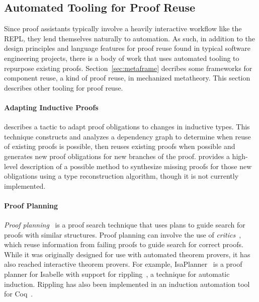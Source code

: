 

\subsection{Automated Tooling for Proof Reuse}
\label{sec:toolingreuse}

Since proof assistants typically involve a heavily interactive workflow like the REPL, they lend themselves naturally to automation.
As such, in addition to the design principles and language features for proof reuse found in typical
software engineering projects, there is a body of work that uses automated tooling
to repurpose existing proofs. Section~\ref{sec:metaframe} decribes some frameworks
for component reuse, a kind of proof reuse, in mechanized metatheory. This section describes
other tooling for proof reuse.

\paragraph{Adapting Inductive Proofs} \cite{Boite2004} describes a tactic to adapt proof obligations
to changes in inductive types. This technique constructs and analyzes a dependency graph to determine
when reuse of existing proofs is possible, then reuses existing proofs when possible
and generates new proof obligations for new branches of the proof. \cite{Mulhern06proofweaving} provides a high-level
description of a possible method to synthesize missing proofs for those new obligations using a type reconstruction algorithm,
though it is not currently implemented.

\paragraph{Proof Planning} \textit{Proof planning}~\citep{Bundy1998} is a proof search technique
that uses plans to guide search for proofs with similar structures.
Proof planning can involve the use of \textit{critics}~\citep{ireland1996},
which reuse information from failing proofs to guide search for correct proofs.
While it was originally designed for use with automated theorem provers, it has also reached
interactive theorem provers.
For example, IsaPlanner~\citep{Dixon2003} is a proof planner for Isabelle with support
for rippling~\citep{shah2005}, a technique for automatic induction.
Rippling has also been implemented in an induction automation
tool for Coq~\citep{wilson2010}.

